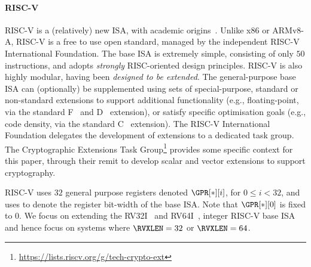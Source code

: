 
\paragraph{RISC-V}
\label{sec:bg:riscv}

RISC-V is a (relatively) new ISA, with academic origins~\cite{riscv:1,riscv:2}.
Unlike x86 or ARMv8-A, RISC-V is a free to use 
open standard, managed by the independent RISC-V International Foundation.
The base ISA is extremely simple, consisting of only $50$ instructions,
and adopts {\em strongly} RISC-oriented design principles.
RISC-V is also highly modular, having been {\em designed to be extended}.
The general-purpose base ISA can (optionally) be
supplemented using sets of special-purpose, standard or non-standard
extensions to
support additional functionality 
(e.g., floating-point, 
       via the 
       standard F~\cite[Section 11]{RV:ISA:I:19}
                and
                D~\cite[Section 12]{RV:ISA:I:19}
       extension),
or 
satisfy specific optimisation goals
(e.g., code density, 
       via the 
       standard C~\cite[Section 16]{RV:ISA:I:19}
       extension).
The RISC-V International Foundation delegates the development of
extensions to a dedicated task group.
The Cryptographic Extensions Task
Group\footnote{
  \url{https://lists.riscv.org/g/tech-crypto-ext}
} provides some specific context for this paper, through their remit to 
develop scalar and vector extensions to support cryptography.

RISC-V uses $32$ general purpose registers
denoted $\GPR[*][ i ]$, for $0 \leq i < 32$,
and uses \RVXLEN to denote the register bit-width of the base ISA.
Note that 
$
\GPR[*][ 0 ]
$
is fixed to $0$.
We focus on extending the
RV32I~\cite[Section 2]{RV:ISA:I:19}
and 
RV64I~\cite[Section 5]{RV:ISA:I:19},
integer RISC-V base ISA
and hence focus on systems where 
$\RVXLEN = 32$
or
$\RVXLEN = 64$.

